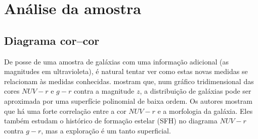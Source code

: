 



\chapter{Análise da amostra \STARLIGHTUV}
\label{sec:Analise}



\section{Diagrama cor--cor}

De posse de uma amostra de galáxias com uma informação adicional (as magnitudes
em ultravioleta), é natural tentar ver como estas novas medidas se relacionam às
medidas conhecidas. \citet{Chilingarian2011} mostram que, num gráfico
tridimensional das cores $NUV-r$ e $g-r$ contra a magnitude $z$, a distribuição
de galáxias pode ser aproximada por uma superfície polinomial de baixa ordem. Os
autores mostram que há uma forte correlação entre a cor $NUV-r$ e a morfologia
da galáxia. Eles também estudam o histórico de formação estelar (SFH) no
diagrama $NUV-r$ contra $g-r$, mas a exploração é um tanto superficial.

